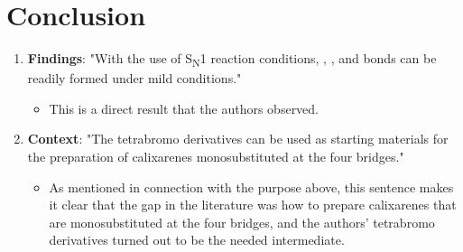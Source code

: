 \documentclass[titlepage]{article}
\begin{document}
\section*{Conclusion}
\begin{enumerate}
    \item \textbf{Findings}: "With the use of S\textsubscript{N}1 reaction conditions, , , and  bonds can be readily formed under mild conditions."
    \begin{itemize}
        \item This is a direct result that the authors observed.
    \end{itemize}
    \item \textbf{Context}: "The tetrabromo derivatives can be used as starting materials for the preparation of calixarenes monosubstituted at the four bridges."
    \begin{itemize}
        \item As mentioned in connection with the purpose above, this sentence makes it clear that the gap in the literature was how to prepare calixarenes that are monosubstituted at the four bridges, and the authors' tetrabromo derivatives turned out to be the needed intermediate.
    \end{itemize}
\end{enumerate}
\end{document}
